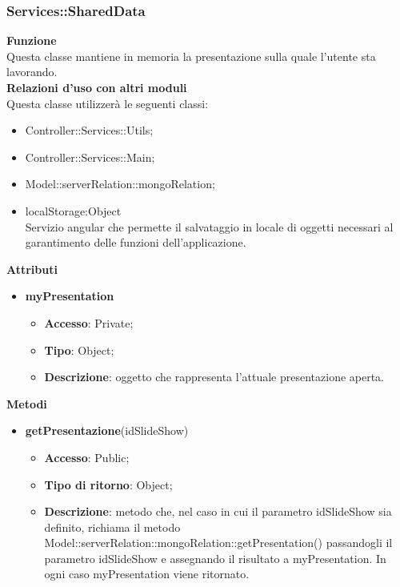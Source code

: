 {{		\subsubsection{Services::\-SharedData}{
			\label{sub:servicesSharedData}
			\textbf{Funzione}\\
			\indent Questa classe mantiene in memoria la presentazione sulla quale l'utente sta lavorando.\\
			\textbf{Relazioni d'uso con altri moduli}\\
			\indent Questa classe utilizzerà le seguenti classi:
			\begin{itemize}
				\item Controller::Services::\-Utils;
				\item Controller::Services::\-Main;
				\item Model::serverRelation::mongoRelation;
				\item localStorage:Object\\
					\indent Servizio angular che permette il salvataggio in locale di oggetti necessari al garantimento delle funzioni dell'applicazione.
			\end{itemize}
			\textbf{Attributi}\\
			\begin{itemize}
				\item \textbf{myPresentation}
				\begin{itemize}
					\item \textbf{Accesso}: Private;
					\item \textbf{Tipo}: Object;
					\item \textbf{Descrizione}: oggetto che rappresenta l'attuale presentazione aperta.
				\end{itemize}
			\end{itemize}
			\textbf{Metodi}
			\begin{itemize}
				\item \textbf{getPresentazione}(idSlideShow)
				\begin{itemize}
					\item \textbf{Accesso}: Public;
					\item \textbf{Tipo di ritorno}: Object;
					\item \textbf{Descrizione}: metodo che, nel caso in cui il parametro idSlideShow sia definito, richiama il metodo Model::\-serverRelation::\-mongoRelation::\-getPresentation() passandogli il parametro idSlideShow e assegnando il risultato a myPresentation. In ogni caso myPresentation viene ritornato.
				\end{itemize}
			\end{itemize}
		}
}}
